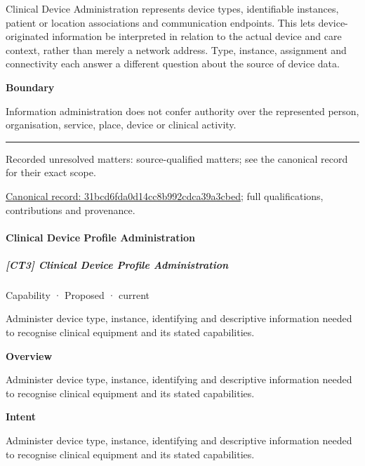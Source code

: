 Clinical Device Administration represents device types, identifiable instances, patient or location associations and communication endpoints. This lets device-originated information be interpreted in relation to the actual device and care context, rather than merely a network address. Type, instance, assignment and connectivity each answer a different question about the source of device data.



\textbf{Boundary}



Information administration does not confer authority over the represented person, organisation, service, place, device or clinical activity.



\medskip\hrule\medskip

{\small Recorded unresolved matters: source-qualified matters; see the canonical record for their exact scope.}\par
{\footnotesize \href{../../../../continuum/strategy/capability/31bcd6fda0d14cc8b992cdca39a3cbed.md}{Canonical record: 31bcd6fda0d14cc8b992cdca39a3cbed}; full qualifications, contributions and provenance.}\par
\paragraph{Clinical Device Profile Administration}

\subparagraph{[CT3] Clinical Device Profile Administration}

\label{element:d0a1ba80c790476ea6042290eb7ea09e}
{\small Capability · Proposed · current}\par

Administer device type, instance, identifying and descriptive information needed to recognise clinical equipment and its stated capabilities.



\textbf{Overview}



Administer device type, instance, identifying and descriptive information needed to recognise clinical equipment and its stated capabilities.



\textbf{Intent}



Administer device type, instance, identifying and descriptive information needed to recognise clinical equipment and its stated capabilities.



